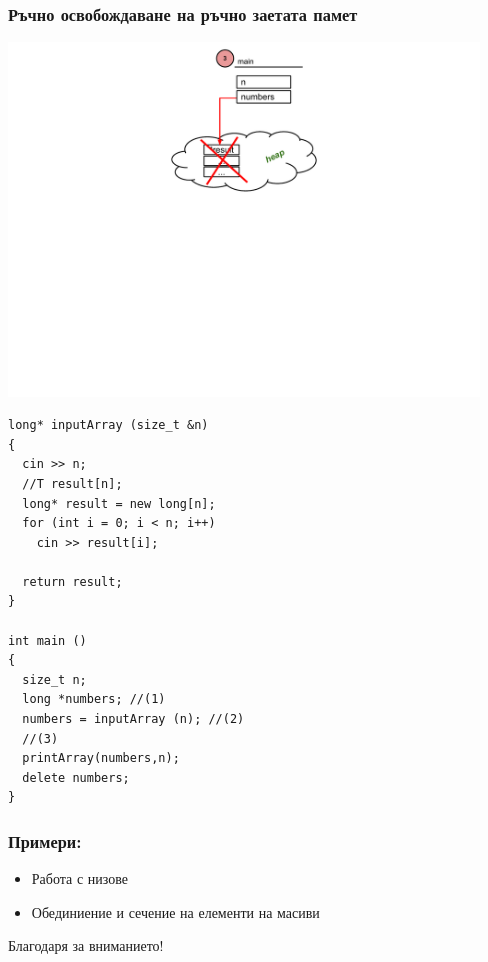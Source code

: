 \documentclass{beamer}
\begin{document}
\begin{frame}[fragile]
\frametitle{Ръчно освобождаване на ръчно заетата памет}


\includegraphics[width=12.5cm]{images/delete}

\vspace{-230px}
\begin{flushleft}
\begin{lstlisting}
long* inputArray (size_t &n)
{ 
  cin >> n;
  //T result[n];
  long* result = new long[n];
  for (int i = 0; i < n; i++)
    cin >> result[i];

  return result;
}

int main ()
{
  size_t n;
  long *numbers; //(1)
  numbers = inputArray (n); //(2)
  //(3) 
  printArray(numbers,n);
  delete numbers;
} 

\end{lstlisting}  
\end{flushleft}

\end{frame}




\begin{frame}[fragile]
\frametitle{Примери:}

\begin{itemize}
  \item Работа с низове
  \item Обединиение и сечение на елементи на масиви
\end{itemize}


\end{frame}


\begin{frame}
\centerline{Благодаря за вниманието!}
\end{frame}
\end{document}
